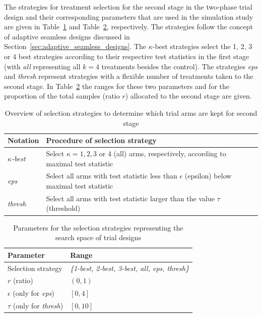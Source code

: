 \documentclass[bimj,fleqn]{w-art}
\theoremstyle{plain}
\theoremstyle{definition}
\begin{document}
The strategies for treatment selection for the second stage in the two-phase trial design and their corresponding parameters that are used in the simulation study are given in Table~\ref{tab:selection_strategies} and Table~\ref{tab:search_space}, respectively.
The strategies follow the concept of adaptive seamless designs discussed in Section~\ref{sec:adaptive_seamless_designs}. 
The $\kappa$-best strategies select the 1, 2, 3 or 4 best strategies according to their respective test statistics in the first stage (with \emph{all} representing all $k=4$ treatments besides the control). 
The strategies \emph{eps} and \emph{thresh} represent strategies with a flexible number of treatments taken to the second stage. 
In Table~\ref{tab:search_space} the ranges for these two parameters and for the proportion of the total samples (ratio $r$) allocated to the second stage are given.
\begin{table}[h]
  \caption{Overview of selection strategies to determine which trial arms are kept for second stage}
  \label{tab:selection_strategies}
  \centering
  \begin{tabular}{ll}
  \hline
  Notation       & Procedure of selection strategy  \\
  \hline
  \emph{$\kappa$-best}    & Select $\kappa = 1, 2, 3$ or 4 (all) arms, respectively, according to maximal test statistic \\
  \emph{eps}     & Select all arms with test statistic less than $\epsilon$ (epsilon) below maximal test statistic \\
  \emph{thresh}  & Select all arms with test statistic larger than the value $\tau$ (threshold) \\
  \hline
  \end{tabular}
\end{table}
\begin{table}[h]
  \caption{Parameters for the selection strategies representing the search space of trial designs}
  \label{tab:search_space}
  \centering
  \begin{tabular}{ll}
  \hline
  Parameter                        & Range \\
  \hline
  Selection strategy               & \emph{\{1-best, 2-best, 3-best, all, eps, thresh\}} \\
  $r$ (ratio)                      & $(0,1)$ \\
  $\epsilon$ (only for \emph{eps}) & $[0,4]$ \\
  $\tau$ (only for \emph{thresh})  & $[0,10]$ \\
  \hline
  \end{tabular}
\end{table}
\end{document}
